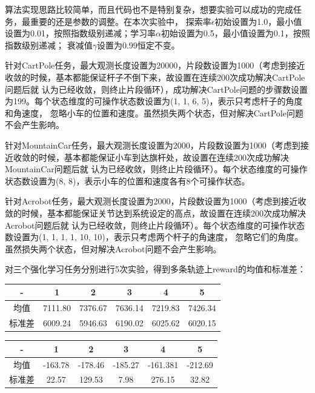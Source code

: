 \documentclass[a4paper,UTF8]{article}
\theoremstyle{definition}
\begin{document}
算法实现思路比较简单，而且代码也不是特别复杂，想要实验可以成功的完成任务，最重要的还是参数的调整。在本次实验中，
探索率$\epsilon$初始设置为1.0，最小值设置为0.01，按照指数级别递减；学习率$\alpha$初始设置为0.5，最小值设置为0.1，按照指数级别递减；
衰减值$\gamma$设置为0.99恒定不变。

针对CartPole任务，最大观测长度设置为20000，片段数设置为1000（考虑到接近收敛的时候，基本都能保证杆子不倒下来，故设置在连续200次成功解决CartPole问题后就
认为已经收敛，则终止片段循环），成功解决CartPole问题的步骤数设置为199。每个状态维度的可操作状态数设置为(1, 1, 6, 5)，表示只考虑杆子的角度和角速度，
忽略小车的位置和速度。虽然损失两个状态，但对解决CartPole问题不会产生影响。

针对MountainCar任务，最大观测长度设置为2000，片段数设置为1000（考虑到接近收敛的时候，基本都能保证小车到达旗杆处，故设置在连续200次成功解决MountainCar问题后就
认为已经收敛，则终止片段循环）。每个状态维度的可操作状态数设置为(8, 8)，表示小车的位置和速度各有8个可操作状态。

针对Acrobot任务，最大观测长度设置为2000，片段数设置为1000（考虑到接近收敛的时候，基本都能保证关节达到系统设定的高点，故设置在连续200次成功解决Acrobot问题后就
认为已经收敛，则终止片段循环）。每个状态维度的可操作状态数设置为(1, 1, 1, 1, 10, 10)，表示只考虑两个杆子的角速度，
忽略它们的角度。虽然损失两个状态，但对解决Acrobot问题不会产生影响。

对三个强化学习任务分别进行5次实验，得到多条轨迹上reward的均值和标准差：

	\begin{tabular}{|c|c|c|c|c|c|}
	
		\hline
		
		\hline
		
		- & 1 & 2 & 3 & 4 & 5 \\
		
		\hline
		
		均值 & 7111.80 & 7376.67 & 7636.14 & 7219.83 & 7426.34\\

		\hline

		标准差 & 6009.24 & 5946.63 & 6190.02 & 6025.62 & 6020.15\\
		
		\hline
	
	\end{tabular}
	

	\begin{tabular}{|c|c|c|c|c|c|}
	
		\hline
		
		\hline
		
		- & 1 & 2 & 3 & 4 & 5 \\
		
		\hline
		
		均值 & -163.78 & -178.46 & -185.27 & -161.381 & -212.69\\

		\hline

		标准差 & 22.57 & 129.53 & 7.98 & 276.15 & 32.82\\
		
		\hline
	
	\end{tabular}
	
\end{document}
